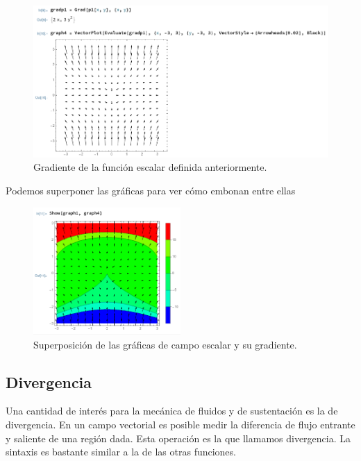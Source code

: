 \documentclass[12pt, letterpaper]{article}
\begin{document}
\begin{figure}[H]
	\centering
	\includegraphics[width=\textwidth]{4.png}
	\caption{Gradiente de la función escalar definida anteriormente.}
\end{figure}

Podemos superponer las gráficas para ver cómo embonan entre ellas
\begin{figure}[H]
	\centering
	\includegraphics[width=0.5\textwidth]{5.png}
	\caption{Superposición de las gráficas de campo escalar y su gradiente.}
\end{figure}

\subsection*{Divergencia}
Una cantidad de interés para la mecánica de fluidos y de sustentación es la de divergencia. En un campo vectorial es posible medir la diferencia de flujo entrante y saliente de una región dada. Esta operación es la que llamamos divergencia. La sintaxis es bastante similar a la de las otras funciones.
\end{document}
